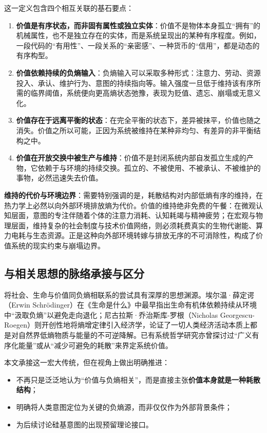 \documentclass[11pt,a4paper]{ctexart}
\begin{document}
这一定义包含四个相互关联的基石要点：
\begin{enumerate}
    \item \textbf{价值是有序状态，而非固有属性或独立实体}：价值不是物体本身孤立“拥有”的机械属性，也不是独立存在的实体，而是系统呈现出的某种有序程度。例如，一段代码的“有用性”、一段关系的“亲密感”、一种货币的“信用”，都是动态的有序构型。
    \item \textbf{价值依赖持续的负熵输入}：负熵输入可以采取多种形式：注意力、劳动、资源投入、承认、维护行为、意图的持续指向等。输入强度一旦低于维持该有序所需的临界阈值，系统便向更高熵状态弛豫，表现为贬值、遗忘、崩塌或无意义化。
    \item \textbf{价值存在于远离平衡的状态}：在完全平衡的状态下，差异被抹平，价值也随之消失。价值之所以可能，正因为系统被维持在某种非均匀、有差异的非平衡结构之中。
    \item \textbf{价值在开放交换中被生产与维持}：价值不是封闭系统内部自发孤立生成的产物，它依赖于与环境的持续交换。孤立的、不被使用、不被承认、不被维护的事物，必然迅速失去价值。
\end{enumerate}

\textbf{维持的代价与环境边界}：需要特别强调的是，耗散结构对内部低熵有序的维持，在热力学上必然以向外部环境排放熵为代价。价值的维持绝非免费的午餐：在微观认知层面，意图的专注伴随着个体的注意力消耗、认知耗竭与精神疲劳；在宏观与物理层面，维持复杂的社会制度与技术价值网络，则必须耗费真实的生物代谢能、算力电耗与生态资源。正是这种向外部环境转嫁与排放无序的不可消除性，构成了价值系统的现实约束与崩塌边界。

\subsection{与相关思想的脉络承接与区分}
将社会、生命与价值同负熵相联系的尝试具有深厚的思想渊源。埃尔温·薛定谔（Erwin Schrödinger）在《生命是什么》中最早指出生命有机体依赖持续从环境中“汲取负熵”以避免走向退化\cite{schrodinger1944what}；尼古拉斯·乔治斯库-罗根（Nicholas Georgescu-Roegen）则开创性地将熵增定律引入经济学，论证了一切人类经济活动本质上都是对自然界低熵物质与能量的不可逆降解\cite{georgescu1971entropy}。已有系统哲学研究亦曾探讨过“广义有序化能量”或从“减少可避免的耗散”来界定系统价值。

本文承接这一宏大传统，但在视角上做出明确推进：
\begin{itemize}
    \item 不再只是泛泛地认为“价值与负熵相关”，而是直接主张\textbf{价值本身就是一种耗散结构}；
    \item 明确将人类意图定位为关键的负熵源，而非仅仅作为外部背景条件；
    \item 为后续讨论硅基意图的出现预留理论接口。
\end{itemize}
\end{document}
